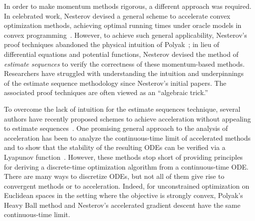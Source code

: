 \documentclass[11pt]{article}
\theoremstyle{plain}
\begin{document}
In order to make momentum methods rigorous, a different approach was required.  In celebrated work, Nesterov devised a general scheme to accelerate convex optimization methods, achieving optimal running times under oracle models in convex programming~\cite{Nesterov04}. However, to achieve such general applicability, Nesterov's proof techniques abandoned the physical intuition of Polyak~\cite{Nesterov04}; in lieu of differential equations and potential functions, Nesterov devised the method of \emph{estimate sequences} to verify the correctness of these momentum-based methods.  Researchers have struggled with understanding the intuition and underpinnings of the estimate sequence methodology since Nesterov's initial papers.  The associated proof techniques are often viewed as an ``algebraic trick.''  

To overcome the lack of intuition for the estimate sequences technique, several authors have recently proposed schemes to achieve acceleration without appealing to estimate sequences~\cite{Fazel, BubeckLeeSingh15, Lessard14}.  One promising general approach to the analysis of acceleration has been to analyze the continuous-time limit of accelerated methods and to show that the stability of the resulting ODEs can be verified via a Lyapunov function~\cite{SuBoydCandes14,Krichene15,Acceleration}.  However, these methods stop short of providing principles for deriving a discrete-time optimization algorithm from a continuous-time ODE.  There are many ways to discretize ODEs, but not all of them give rise to convergent methods or to acceleration.  Indeed, for unconstrained optimization on Euclidean spaces in the setting where the objective is strongly convex, Polyak's Heavy Ball method and Nesterov's accelerated gradient descent have the same continuous-time limit.
\end{document}
